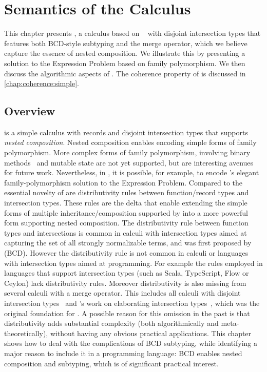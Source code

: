 
\chapter{Semantics of the \namee Calculus}
\label{chap:nested}

This chapter presents \namee, a calculus based on \oname~\citep{oliveira2016disjoint} with disjoint intersection types that
features both BCD-style subtyping and the merge operator, which we believe
capture the essence of nested composition. We illustrate this by presenting a
solution to the Expression Problem based on family polymorphism. We then discuss
the algorithmic aspects of \namee. The coherence property of \namee is discussed
in \cref{chap:coherence:simple}.

\section{Overview}

\namee is a simple calculus with records and disjoint intersection types that
supports \emph{nested composition}. Nested composition enables encoding simple
forms of family polymorphism. More complex forms of family polymorphism,
involving binary methods~\citep{bruce1995binary} and mutable state are not yet
supported, but are interesting avenues for future work. Nevertheless, in \namee,
it is possible, for example, to encode \citeauthor{Ernst_2001}'s elegant family-polymorphism
solution to the Expression Problem. Compared to \oname the essential novelty of
\namee are distributivity rules between function/record types and intersection
types. These rules are the delta that enable extending the simple forms of
multiple inheritance/composition supported by \oname into a more powerful form
supporting nested composition. The distributivity rule between function types
and intersections is common in calculi with intersection types aimed at
capturing the set of all strongly normalizable terms, and was first proposed by
\citet{Barendregt_1983} (BCD). However the distributivity rule is not common in
calculi or languages with intersection types aimed at programming. For example
the rules employed in languages that support intersection types (such as Scala,
TypeScript, Flow or Ceylon) lack distributivity rules. Moreover distributivity
is also missing from several calculi with a merge operator. This includes all
calculi with disjoint intersection types~\citep{oliveira2016disjoint, alpuimdisjoint}
and \citeauthor{dunfield2014elaborating}'s work on elaborating
intersection types~\citep{dunfield2014elaborating}, which was the original
foundation for \oname. A possible reason for this omission in the past is that
distributivity adds substantial complexity (both algorithmically and
meta-theoretically), without having any obvious practical applications. This
chapter shows how to deal with the complications of BCD subtyping, while
identifying a major reason to include it in a programming language: BCD enables
nested composition and subtyping, which is of significant practical interest.


